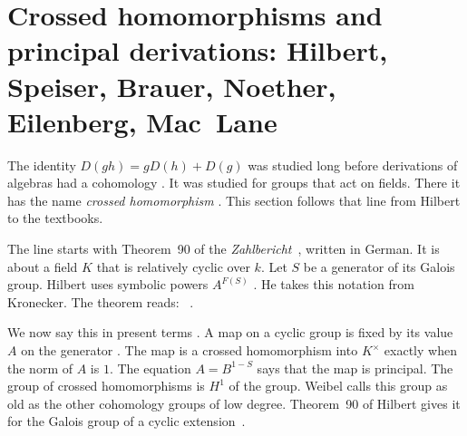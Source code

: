 \section[Crossed homomorphisms and principal derivations: Hilbert, Speiser, Brauer, Noether, Eilenberg, Mac~Lane][Crossed homomorphisms]{Crossed homomorphisms and principal derivations: Hilbert, Speiser, Brauer, Noether, Eilenberg, Mac~Lane}\label{sec:origins:crossed-homomorphisms}

The identity $D(gh) = gD(h) + D(g)$ was studied long before derivations of
algebras had a cohomology \cite[Definition, p.~516]{Weibel1994}. It was
studied for groups that act on fields. There it has the name \emph{crossed
homomorphism} \cite[Definition, p.~516]{Weibel1994}. This section follows that
line from Hilbert to the textbooks.

The line starts with Theorem~90 of the \emph{Zahlbericht}~\cite{Hilbert1897},
written in German. It is about a field $K$ that is relatively cyclic over $k$.
Let $S$ be a generator of its Galois group. Hilbert uses symbolic powers
$A^{F(S)}$ \cite{Hilbert1897}. He takes this notation from Kronecker. The
theorem reads: ~\cite[\S 54, Satz~90, p.~272]{Hilbert1897}.

We now say this in present terms \cite[p.~806]{Weibel1999History}. A map on a
cyclic group is fixed by its value $A$ on the generator
\cite[p.~806]{Weibel1999History}. The map is a crossed homomorphism into
$K^{\times}$ exactly when the norm of $A$ is $1$. The equation $A = B^{1-S}$
says that the map is principal. The group of crossed homomorphisms is $H^1$ of
the group. Weibel calls this group as old as the other cohomology groups of
low degree. Theorem~90 of Hilbert gives it for the Galois group of a cyclic
extension~\cite[p.~806]{Weibel1999History}.

